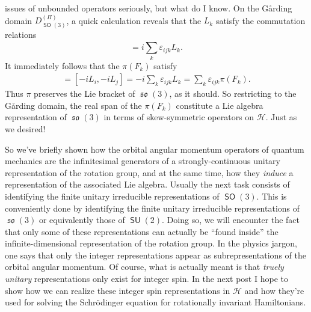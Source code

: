 \documentclass[a4paper]{article}
\DeclareMathOperator{\SO}{\mathsf{SO}}
\DeclareMathOperator{\SU}{\mathsf{SU}}
\DeclareMathOperator{\so}{\mathfrak{so}}
\begin{document}
    issues of unbounded operators seriously, but what do I
    know. On the Gårding domain $D_{\SO(3)}^{(\Pi)}$, a quick
    calculation reveals that the $L_k$ satisfy the
    commutation relations
    \begin{equation}
        [L_i, L_j]
        = i \sum_{k}^{} \varepsilon_{ijk} L_k.
    \end{equation}
    It immediately follows that the $\pi(F_k)$ satisfy
    \begin{align}
        [\pi(F_i), \pi(F_j)]
        = [-i L_i, -i L_j]
        = -i \sum_{k}^{} \varepsilon_{ijk} L_k
        = \sum_{k}^{} \varepsilon_{ijk} \pi(F_k).
    \end{align}
    Thus $\pi$ preserves the Lie bracket of
    $\so(3)$, as it should. So restricting to the
    Gårding domain, the real span of the $\pi(F_k)$
    constitute a Lie algebra representation of $\so(3)$ in
    terms of skew-symmetric operators on $\mathcal{H}$. Just
    as we desired!

    So we've briefly shown how the orbital angular
    momentum operators of quantum mechanics are the
    infinitesimal generators of a strongly-continuous
    unitary representation of the rotation group, and at the
    same time, how they \textit{induce} a representation of
    the associated Lie algebra. Usually the next task
    consists of identifying the finite unitary irreducible
    representations of $\SO(3)$. This is conveniently done
    by identifying the finite unitary irreducible
    representations of $\so(3)$ or equivalently those of
    $\SU(2)$.  Doing so, we will encounter the fact that
    only some of these representations can actually be
    ``found inside'' the infinite-dimensional representation
    of the rotation group. In the physics jargon, one says
    that only the integer representations appear as
    subrepresentations of the orbital angular momentum.  Of
    course, what is actually meant is that \textit{truely
    unitary} representations only exist for integer spin.
    In the next post I hope to show how we can realize these
    integer spin representations in $\mathcal{H}$ and how
    they're used for solving the Schrödinger equation for
    rotationally invariant Hamiltonians. 
    
    
\end{document}
